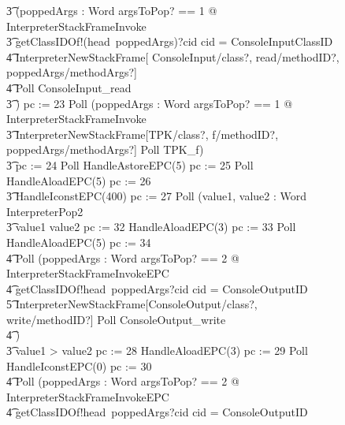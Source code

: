 \begin{figure}[tp!]
{\begin{circus}
    \t3 (\circvar poppedArgs : \seq Word \circspot \lschexpract \exists argsToPop?  == 1 @ InterpreterStackFrameInvoke \rschexpract \circseq \\
    \t3 getClassIDOf!(head~poppedArgs)?cid \then \circif cid = ConsoleInputClassID \circthen {} \\
    \t4 \lschexpract InterpreterNewStackFrame[ ConsoleInput/class?, read/methodID?, poppedArgs/methodArgs?] \rschexpract \circseq \\
    \t4 Poll \circseq ConsoleInput\_read \\
    \t3 \circfi) \circseq pc := 23 \circseq Poll \circseq (\circvar poppedArgs : \seq Word \circspot \lschexpract \exists argsToPop? == 1 @ InterpreterStackFrameInvoke \rschexpract \circseq \\
    \t3 \lschexpract InterpreterNewStackFrame[TPK/class?, f/methodID?, poppedArgs/methodArgs?] \rschexpract \circseq Poll \circseq TPK\_f) \circseq \\
    \t3 pc := 24 \circseq Poll \circseq HandleAstoreEPC(5) \circseq pc := 25 \circseq Poll \circseq HandleAloadEPC(5) \circseq pc := 26 \circseq \\
    \t3 HandleIconstEPC(400) \circseq pc := 27 \circseq Poll \circseq (\circvar value1, value2 : Word \circspot InterpreterPop2 \circseq \\
    \t3 \circif value1 \leq value2 \circthen pc := 32 \circseq HandleAloadEPC(3) \circseq pc := 33 \circseq Poll \circseq HandleAloadEPC(5) \circseq pc := 34 \circseq \\
    \t4 Poll \circseq (\circvar poppedArgs : Word \circspot \lschexpract \exists argsToPop? == 2 @ InterpreterStackFrameInvokeEPC \rschexpract \circseq \\
    \t4 getClassIDOf!head~poppedArgs?cid \then \circif cid = ConsoleOutputID \circthen {} \\
    \t5 \lschexpract InterpreterNewStackFrame[ConsoleOutput/class?, write/methodID?] \rschexpract \circseq  Poll \circseq ConsoleOutput\_write \\
    \t4 \circfi) \\
    \t3 {} \circelse value1 > value2 \circthen pc := 28 \circseq HandleAloadEPC(3) \circseq pc := 29 \circseq Poll \circseq HandleIconstEPC(0) \circseq pc := 30 \circseq \\
    \t4 Poll \circseq (\circvar poppedArgs : Word \circspot \lschexpract \exists argsToPop? == 2 @ InterpreterStackFrameInvokeEPC \rschexpract \circseq \\
    \t4 getClassIDOf!head~poppedArgs?cid \then \circif cid = ConsoleOutputID \circthen {} \\

\end{circus}}
\end{figure}
